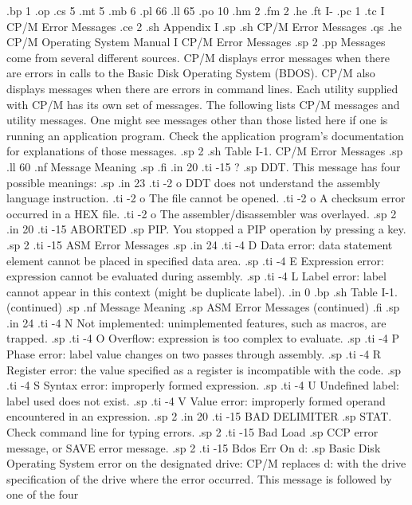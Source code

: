 .bp 1
.op
.cs 5
.mt 5
.mb 6
.pl 66
.ll 65
.po 10
.hm 2
.fm 2
.he
.ft                                I-%
.pc 1
.tc I  CP/M Error Messages
.ce 2
.sh
Appendix I
.sp
.sh
CP/M Error Messages
.qs
.he CP/M Operating System Manual               I  CP/M Error Messages
.sp 2
.pp
Messages come from several different sources.  CP/M displays 
error messages when there are errors in calls to the Basic Disk 
Operating System (BDOS).  CP/M also displays messages when there 
are errors in command lines.  Each utility supplied with CP/M has 
its own set of messages.  The following lists CP/M messages and 
utility messages.  One might see messages other than those listed 
here if one is running an application program.  Check the 
application program's documentation for explanations of those 
messages.
.sp 2
.sh
                 Table I-1.  CP/M Error Messages
.sp
.ll 60
.nf
     Message        Meaning
.sp
.fi
.in 20
.ti -15
?
.sp
DDT.  This message has four possible meanings:
.sp
.in 23
.ti -2
o DDT does not understand the assembly language instruction.
.ti -2
o The file cannot be opened.
.ti -2
o A checksum error occurred in a HEX file.
.ti -2
o The assembler/disassembler was overlayed.
.sp 2
.in 20
.ti -15
ABORTED
.sp
PIP.  You stopped a PIP operation by pressing a key.
.sp 2
.ti -15
ASM Error Messages
.sp
.in 24
.ti -4
D   Data error:  data statement element cannot be placed in 
specified data area.
.sp
.ti -4
E   Expression error:  expression cannot be evaluated during 
assembly.
.sp
.ti -4
L   Label error:  label cannot appear in this context (might be 
duplicate label).
.in 0
.bp
.sh
                     Table I-1.  (continued)
.sp
.nf
     Message        Meaning
.sp
     ASM Error Messages (continued)
.fi
.sp
.in 24
.ti -4
N   Not implemented:  unimplemented features, such as macros, are 
trapped.
.sp
.ti -4
O   Overflow:  expression is too complex to evaluate.
.sp
.ti -4
P   Phase error:  label value changes on two passes through 
assembly.
.sp
.ti -4
R   Register error:  the value specified as a register is 
incompatible with the code.
.sp
.ti -4
S   Syntax error:  improperly formed expression.
.sp
.ti -4
U   Undefined label:  label used does not exist.
.sp
.ti -4
V   Value error:  improperly formed operand encountered in an 
expression.
.sp 2
.in 20
.ti -15
BAD DELIMITER
.sp
STAT.  Check command line for typing errors.
.sp 2
.ti -15
Bad Load
.sp
CCP error message, or SAVE error message.
.sp 2
.ti -15
Bdos Err On d:
.sp
Basic Disk Operating System error on the designated drive:  CP/M 
replaces d: with the drive specification of the drive where the 
error occurred.  This message is followed by one of the four 

